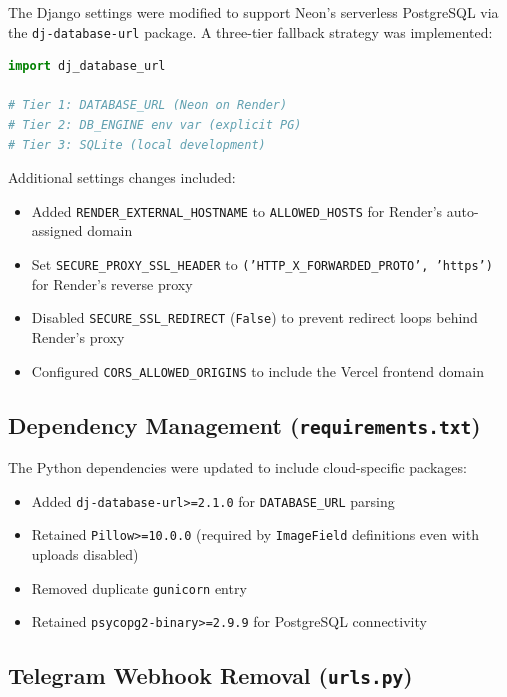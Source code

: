 \documentclass[conference]{IEEEtran}
\begin{document}
The Django settings were modified to support Neon's serverless PostgreSQL via the \texttt{dj-database-url} package. A three-tier fallback strategy was implemented:

\begin{lstlisting}[language=Python, caption={Database configuration fallback}]
import dj_database_url

# Tier 1: DATABASE_URL (Neon on Render)
# Tier 2: DB_ENGINE env var (explicit PG)
# Tier 3: SQLite (local development)
\end{lstlisting}

Additional settings changes included:
\begin{itemize}
    \item Added \texttt{RENDER\_EXTERNAL\_HOSTNAME} to \texttt{ALLOWED\_HOSTS} for Render's auto-assigned domain
    \item Set \texttt{SECURE\_PROXY\_SSL\_HEADER} to \texttt{('HTTP\_X\_FORWARDED\_PROTO', 'https')} for Render's reverse proxy
    \item Disabled \texttt{SECURE\_SSL\_REDIRECT} (\texttt{False}) to prevent redirect loops behind Render's proxy
    \item Configured \texttt{CORS\_ALLOWED\_ORIGINS} to include the Vercel frontend domain
\end{itemize}

\subsection{Dependency Management (\texttt{requirements.txt})}

The Python dependencies were updated to include cloud-specific packages:

\begin{itemize}
    \item Added \texttt{dj-database-url>=2.1.0} for \texttt{DATABASE\_URL} parsing
    \item Retained \texttt{Pillow>=10.0.0} (required by \texttt{ImageField} definitions even with uploads disabled)
    \item Removed duplicate \texttt{gunicorn} entry
    \item Retained \texttt{psycopg2-binary>=2.9.9} for PostgreSQL connectivity
\end{itemize}

\subsection{Telegram Webhook Removal (\texttt{urls.py})}
\end{document}
